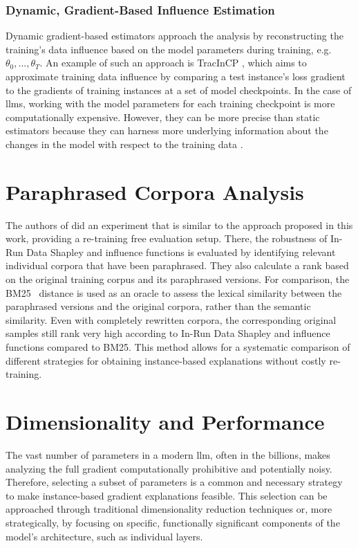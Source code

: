 \subsubsection{Dynamic, Gradient-Based Influence Estimation} \label{subsubsec:dynamic_gradient_based_influence_estimation}
Dynamic gradient-based estimators approach the analysis by reconstructing the training's data influence based on the model parameters during training, e.g. $\theta_0,...,\theta_T$. An example of such an approach is TracInCP \cite{DBLP:conf/nips/PruthiLKS20}, which aims to approximate training data influence by comparing a test instance's loss gradient to the gradients of training instances at a set of model checkpoints. In the case of \acrlong{llm}s, working with the model parameters for each training checkpoint is more computationally expensive. However, they can be more precise than static estimators because they can harness more underlying information about the changes in the model with respect to the training data \cite{DBLP:journals/ml/HammoudehL24}.

\section{Paraphrased Corpora Analysis}
The authors of \cite{DBLP:conf/iclr/WangMS025} did an experiment that is similar to the approach proposed in this work, providing a re-training free evaluation setup. There, the robustness of In-Run Data Shapley and influence functions is evaluated by identifying relevant individual corpora that have been paraphrased. They also calculate a rank based on the original training corpus and its paraphrased versions. For comparison, the BM25~\cite{DBLP:journals/ftir/RobertsonZ09} distance is used as an oracle to assess the lexical similarity between the paraphrased versions and the original corpora, rather than the semantic similarity. Even with completely rewritten corpora, the corresponding original samples still rank very high according to In-Run Data Shapley and influence functions compared to BM25. This method allows for a systematic comparison of different strategies for obtaining instance-based explanations without costly re-training.

\section{Dimensionality and Performance}
The vast number of parameters in a modern \acrshort{llm}, often in the billions, makes analyzing the full gradient computationally prohibitive and potentially noisy. Therefore, selecting a subset of parameters is a common and necessary strategy to make instance-based gradient explanations feasible. This selection can be approached through traditional dimensionality reduction techniques or, more strategically, by focusing on specific, functionally significant components of the model's architecture, such as individual layers.

